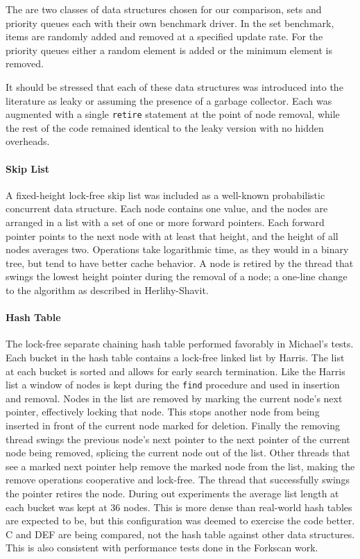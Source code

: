 
The are two classes of data structures chosen for our comparison, sets and priority queues each with their own benchmark driver. In the set benchmark, items are randomly added and removed at a specified update rate. For the priority queues either a random element is added or the minimum element is removed.

It should be stressed that each of these data structures was introduced into the literature as leaky or assuming the presence of a garbage collector.  Each was augmented with a single \texttt{retire} statement at the point of node removal, while the rest of the code remained identical to the leaky version with no hidden overheads.

\paragraph{Skip List} A fixed-height lock-free skip list was included as a well-known probabilistic concurrent data structure.  Each node contains one value, and the nodes are arranged in a list with a set of one or more forward pointers.  Each forward pointer points to the next node with at least that height, and the height of all nodes averages two.  Operations take logarithmic time, as they would in a binary tree, but tend to have better cache behavior. A node is retired by the thread that swings the lowest height pointer during the removal of a node; a one-line change to the algorithm as described in Herlihy-Shavit.\cite{HSBook}

\paragraph{Hash Table} The lock-free separate chaining hash table performed favorably in Michael's tests.\cite{HashTables} Each bucket in the hash table contains a lock-free linked list by Harris.\cite{Harris} The list at each bucket is sorted and allows for early search termination. Like the Harris list a window of nodes is kept during the \texttt{find} procedure and used in insertion and removal. Nodes in the list are removed by marking the current node's next pointer, effectively locking that node. This stops another node from being inserted in front of the current node marked for deletion. Finally the removing thread swings the previous node's next pointer to the next pointer of the current node being removed, splicing the current node out of the list. Other threads that see a marked next pointer help remove the marked node from the list, making the remove operations cooperative and lock-free.  The thread that successfully swings the pointer retires the node.  During out experiments the average list length at each bucket was kept at 36 nodes.  This is more dense than real-world hash tables are expected to be, but this configuration was deemed to exercise the code better.  C and DEF are being compared, not the hash table against other data structures.  This is also consistent with performance tests done in the Forkscan work.\cite{Forkscan}

